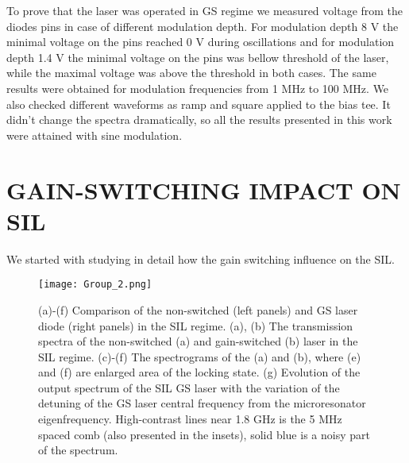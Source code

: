 \documentclass[a4paper, amsfonts, amssymb, amsmath, reprint, showkeys, nofootinbib, twoside,longbibliography, aps]{revtex4-1}
\begin{document}
To prove that the laser was operated in GS regime we measured voltage from the diodes pins in case of different modulation depth. For modulation depth 8 V the minimal voltage on the pins reached 0 V during oscillations and for modulation depth 1.4 V the minimal voltage on the pins was bellow threshold of the laser, while the maximal voltage was above the threshold in both cases. The same results were obtained for modulation frequencies from 1 MHz to 100 MHz.
We also checked different waveforms as ramp and square applied to the bias tee. It didn't change the spectra dramatically, so all the results presented in this work were attained with sine modulation. 

\section{GAIN-SWITCHING IMPACT ON SIL }
We started with studying in detail how the gain switching influence on the SIL.
\begin{figure*}[htbp!]
\centering
\texttt{[image: Group\_2.png]}
\caption{(a)-(f) Comparison of the non-switched (left panels) and GS laser diode (right panels) in the SIL regime. (a), (b) The transmission spectra of the non-switched (a) and gain-switched (b) laser in the SIL regime. (c)-(f) The spectrograms of the (a) and (b), where (e) and (f) are enlarged area of the locking state. (g) Evolution of the output spectrum of the SIL GS laser with the variation of the detuning of the GS laser central frequency from the microresonator eigenfrequency. High-contrast lines near 1.8 GHz is the 5 MHz spaced comb (also presented in the insets), solid blue is a noisy part of the spectrum. }
\label{fig:CombsSIL}
\end{figure*}
\end{document}
